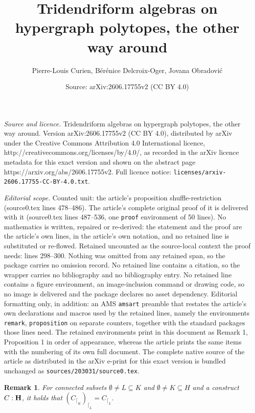 \documentclass[10pt,a4paper]{amsart}
\title{Tridendriform algebras on hypergraph polytopes, the other way around}
\author{Pierre-Louis Curien, B\'er\'enice Delcroix-Oger, Jovana Obradovi\'c}
\date{Source: arXiv:2606.17755v2 (CC BY 4.0)}
\newtheorem{remark}{Remark}
\begin{document}
\maketitle

\noindent\emph{Source and licence.} Tridendriform algebras on hypergraph polytopes, the other way around. Version arXiv:2606.17755v2 (CC BY 4.0), distributed by arXiv under the Creative Commons Attribution 4.0 International licence, http://creativecommons.org/licenses/by/4.0/, as recorded in the arXiv licence metadata for this exact version and shown on the abstract page https://arxiv.org/abs/2606.17755v2. Full licence notice: \texttt{licenses/arxiv-2606.17755-CC-BY-4.0.txt}.\par\smallskip

\noindent\textit{Editorial scope.} Counted unit: the article's proposition shuffle-restriction (source0.tex lines 478--486). The article's complete original proof of it is delivered with it (source0.tex lines 487--536, one \texttt{proof} environment of 50 lines). No mathematics is written, repaired or re-derived: the statement and the proof are the article's own lines, in the article's own notation, and no retained line is substituted or re-flowed.  Retained uncounted as the source-local context the proof needs: lines 298--300.  Nothing was omitted from any retained span, so the package carries no omission record.  No retained line contains a citation, so the wrapper carries no bibliography and no bibliography entry.  No retained line contains a figure environment, an image-inclusion command or drawing code, so no image is delivered and the package declares no asset dependency.  Editorial formatting only, in addition: an AMS \texttt{amsart} preamble that restates the article's own declarations and macros used by the retained lines, namely the environments \texttt{remark}, \texttt{proposition} on separate counters, together with the standard packages those lines need.  The retained environments print in this document as Remark 1, Proposition 1 in order of appearance, whereas the article prints the same items with the numbering of its own full document.  The complete native source of the article as distributed in the arXiv e-print for this exact version is bundled unchanged as \texttt{sources/203031/source0.tex}.
\begin{remark}\label{rest1}
For connected subsets $\emptyset \neq L\subseteq K$ and $\emptyset\neq K\subseteq H$  and a construct $C:{\bf H}$,  it holds that ${(C_{\lceil_K})}_{\lceil_L}=C_{\lceil_L}$.
\end{remark}
\end{document}
